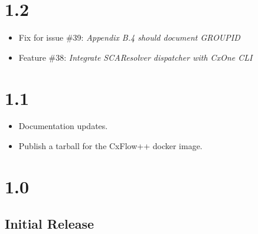 
\section{1.2}

\begin{itemize}
    \item Fix for issue \#39: \textit{Appendix B.4 should document GROUP\textunderscore ID}
    \item Feature \#38: \textit{Integrate SCAResolver dispatcher with CxOne CLI}
\end{itemize}

\section{1.1}

\begin{itemize}
    \item Documentation updates.
    \item Publish a tarball for the CxFlow++ docker image.
\end{itemize}

\section{1.0}

\subsection*{Initial Release}
